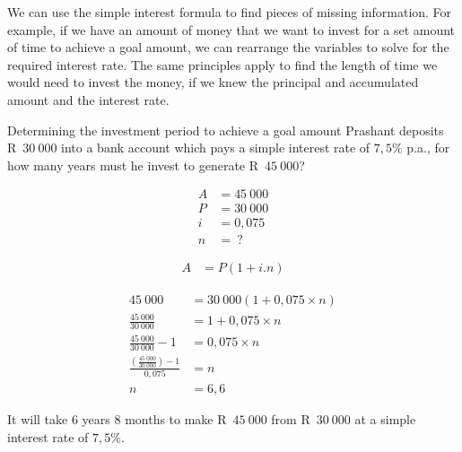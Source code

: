 We can use the simple interest formula to find pieces of missing information. For example, if we have an amount of money that we want to invest for a set amount of time to achieve a goal amount, we can rearrange the variables to solve for the required interest rate. The same principles apply to find the length of time we would need to invest the money, if we knew the principal and accumulated amount and the interest rate.


\begin{wex}{Determining the investment period to achieve a goal amount}{
    Prashant deposits R~$30~000$ into a bank account which pays a simple interest rate of $7,5\%$ p.a., for how many years must he invest to generate R~$45~000$?}{

    \begin{align*}
	A &= 45~000\\
	P &= 30~000\\
	i &= 0,075\\
	n &= ~?
    \end{align*}

    \begin{align*}
	A &= P(1 + i . n)
    \end{align*}

    \begin{align*}
	45~000 &= 30~000(1 + 0,075 \times n)\\
	\frac{45~000}{30~000} &= 1 + 0,075 \times n \\[5pt]
	\frac{45~000}{30~000} -1 &= 0,075 \times n\\[5pt]
	\frac{(\frac{45~000}{30~000}) -1}{0,075} &= n\\
	n &= 6,6
    \end{align*}

    It will take 6 years 8 months to make R~$45~000$ from R~$30~000$ at a simple interest rate of $7,5\%$.
    }
\end{wex}




